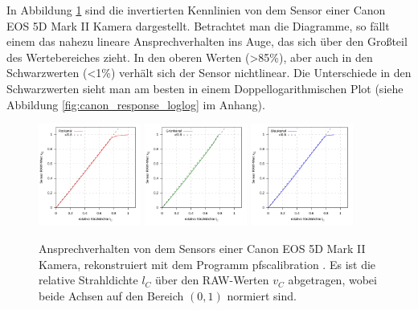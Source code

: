   In Abbildung \ref{fig:canon_response} sind die invertierten Kennlinien von dem Sensor einer Canon EOS 5D Mark II Kamera dargestellt.
  Betrachtet man die Diagramme, so fällt einem das nahezu lineare Ansprechverhalten ins Auge, das sich über den Großteil des Wertebereiches zieht.
  In den oberen Werten (>85\%), aber auch in den Schwarzwerten (<1\%) verhält sich der Sensor nichtlinear.
  Die Unterschiede in den Schwarzwerten sieht man am besten in einem Doppellogarithmischen Plot (siehe Abbildung \ref{fig:canon_response_loglog} im Anhang).
  
  \begin{figure}[h]
    \centering
    \includegraphics[width=0.3\textwidth]{../graphics/kalibrierung/canon_response_0.svg}
    \includegraphics[width=0.3\textwidth]{../graphics/kalibrierung/canon_response_1.svg}
    \includegraphics[width=0.3\textwidth]{../graphics/kalibrierung/canon_response_2.svg}
    \caption[Ansprechverhalten einer DSLR-Kamera]{Ansprechverhalten von dem Sensors einer Canon EOS 5D Mark II Kamera, rekonstruiert mit dem Programm pfscalibration \cite{pfscalibration}.  
    Es ist die relative Strahldichte $l_C$ über den RAW-Werten $v_C$ abgetragen, wobei beide Achsen auf den Bereich $(0,1)$ normiert sind.
 }
    \label{fig:canon_response}
   \end{figure}
  

